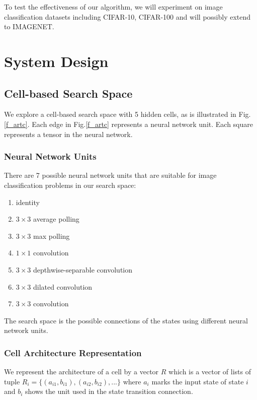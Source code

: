 \documentclass[conference]{IEEEtran}
\begin{document}
    To test the effectiveness of our algorithm, we will experiment on image classification datasets including CIFAR-10, CIFAR-100 and will possibly extend to IMAGENET.


  \section{System Design}
  \subsection{Cell-based Search Space}

  We explore a cell-based search space with 5 hidden cells, as is illustrated in Fig.\ref{f_artc}. Each edge in Fig.\ref{f_artc} represents a neural network unit. Each square represents a tensor in the neural network.

  \subsubsection{Neural Network Units}
  
  There are 7 possible neural network units that are suitable for image classification problems in our search space:

      \begin{enumerate}
        \item identity
        \item $3\times3$ average polling
        \item $3\times3$ max polling
        \item $1\times1$ convolution
        \item $3\times3$ depthwise-separable convolution
        \item $3\times3$ dilated convolution
        \item $3\times3$ convolution
      \end{enumerate}

  The search space is the possible connections of the states using different neural network units.

  \subsubsection{Cell Architecture Representation}

  We represent the architecture of a cell by a vector $R$ which is a vector of lists of tuple $R_{i} = \{(a_{i1}, b_{i1}), (a_{i2}, b_{i2}), ...\}$ where $a_i$ marks the input state of state $i$ and $b_i$ shows the unit used in the state transition connection.
\end{document}
